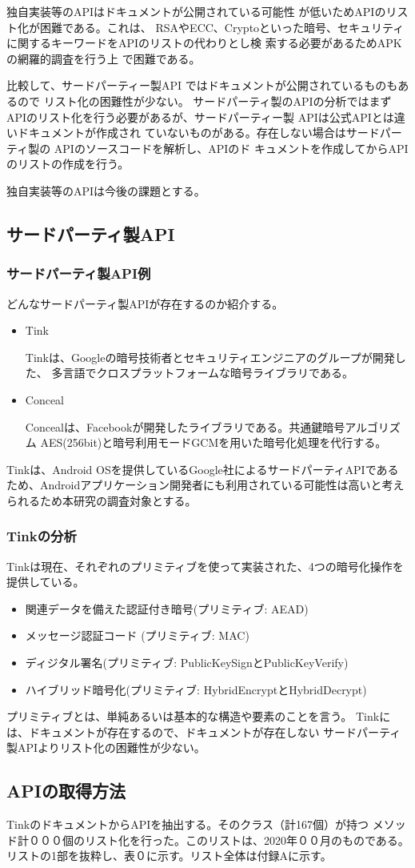 独自実装等のAPIはドキュメントが公開されている可能性
が低いためAPIのリスト化が困難である。これは、
RSAやECC、Cryptoといった暗号、セキュリティ
に関するキーワードをAPIのリストの代わりとし検
索する必要があるためAPKの網羅的調査を行う上
で困難である。

比較して、サードパーティー製API
ではドキュメントが公開されているものもあるので
リスト化の困難性が少ない。
サードパーティ製のAPIの分析ではまずAPIのリスト化を行う必要があるが、サードパーティー製
APIは公式APIとは違いドキュメントが作成され
ていないものがある。存在しない場合はサードパー
ティ製の APIのソースコードを解析し、APIのド
キュメントを作成してからAPIのリストの作成を行う。

独自実装等のAPIは今後の課題とする。

\subsection{サードパーティ製API}

\subsubsection{サードパーティ製API例}
どんなサードパーティ製APIが存在するのか紹介する。
\begin{itemize}
\item Tink　

Tinkは、Googleの暗号技術者とセキュリティエンジニアのグループが開発した、
多言語でクロスプラットフォームな暗号ライブラリである。

\item Conceal

Concealは、Facebookが開発したライブラリである。共通鍵暗号アルゴリズム AES(256bit)と暗号利用モードGCMを用いた暗号化処理を代行する。

\end{itemize}
Tinkは、Android OSを提供しているGoogle社によるサードパーティAPIであるため、Androidアプリケーション開発者にも利用されている可能性は高いと考えられるため本研究の調査対象とする。


\subsubsection{Tinkの分析}

Tinkは現在、それぞれのプリミティブを使って実装された、4つの暗号化操作を提供している。
\begin{itemize}
\item 関連データを備えた認証付き暗号(プリミティブ: AEAD)
\item メッセージ認証コード (プリミティブ: MAC)
\item ディジタル署名(プリミティブ: PublicKeySignとPublicKeyVerify)
\item ハイブリッド暗号化(プリミティブ: HybridEncryptとHybridDecrypt)
\end{itemize}
プリミティブとは、単純あるいは基本的な構造や要素のことを言う。
Tinkには、ドキュメントが存在するので、ドキュメントが存在しない
サードパーティ製APIよりリスト化の困難性が少ない。

\subsection{APIの取得方法}
Tinkのドキュメント\cite{Tink Cryptography}からAPIを抽出する。そのクラス（計167個）が持つ
メソッド計０００個のリスト化を行った。このリストは、2020年００月のものである。
リストの1部を抜粋し、表０に示す。リスト全体は付録Aに示す。


